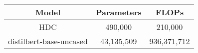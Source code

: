 \begin{tabular}{ccc}
\toprule
Model & Parameters & FLOPs \\
\midrule
HDC & 490,000 & 210,000 \\
distilbert-base-uncased & 43,135,509 & 936,371,712 \\
\bottomrule
\end{tabular}
